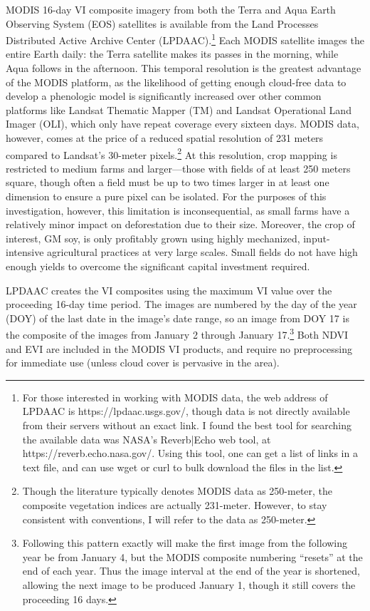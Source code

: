 MODIS 16-day VI composite imagery from both the Terra and Aqua Earth Observing System (EOS) satellites is available from the Land Processes Distributed Active Archive Center (LPDAAC).\footnote{For those interested in working with MODIS data, the web address of LPDAAC is https://lpdaac.usgs.gov/, though data is not directly available from their servers without an exact link. I found the best tool for searching the available data was NASA’s Reverb|Echo web tool, at https://reverb.echo.nasa.gov/. Using this tool, one can get a list of links in a text file, and can use wget or curl to bulk download the files in the list.} Each MODIS satellite images the entire Earth daily: the Terra satellite makes its passes in the morning, while Aqua follows in the afternoon. This temporal resolution is the greatest advantage of the MODIS platform, as the likelihood of getting enough cloud-free data to develop a phenologic model is significantly increased over other common platforms like Landsat Thematic Mapper (TM) and Landsat Operational Land Imager (OLI), which only have repeat coverage every sixteen days. MODIS data, however, comes at the price of a reduced spatial resolution of 231 meters compared to Landsat’s 30-meter pixels.\footnote{Though the literature typically denotes MODIS data as 250-meter, the composite vegetation indices are actually 231-meter. However, to stay consistent with conventions, I will refer to the data as 250-meter.} At this resolution, crop mapping is restricted to medium farms and larger---those with fields of at least 250 meters square, though often a field must be up to two times larger in at least one dimension to ensure a pure pixel can be isolated. For the purposes of this investigation, however, this limitation is inconsequential, as small farms have a relatively minor impact on deforestation due to their size. Moreover, the crop of interest, GM soy, is only profitably grown using highly mechanized, input-intensive agricultural practices at very large scales. Small fields do not have high enough yields to overcome the significant capital investment required. \todo[inline]{NEED A SOURCE FOR THIS---TALK TO POLO]}

LPDAAC creates the VI composites using the maximum VI value over the proceeding 16-day time period. The images are numbered by the day of the year (DOY) of the last date in the image's date range, so an image from DOY 17 is the composite of the images from January 2 through January 17.\footnote{Following this pattern exactly will make the first image from the following year be from January 4, but the MODIS composite numbering ``resets'' at the end of each year. Thus the image interval at the end of the year is shortened, allowing the next image to be produced January 1, though it still covers the proceeding 16 days.} Both NDVI and EVI are included in the MODIS VI products, and require no preprocessing for immediate use (unless cloud cover is pervasive in the area).


